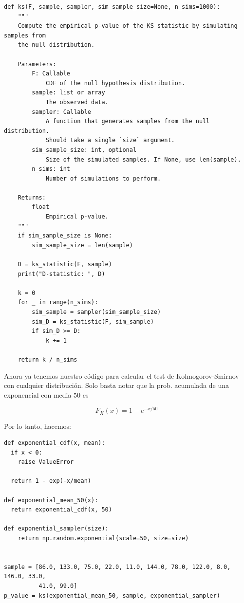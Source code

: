 \documentclass[a4paper, 12pt]{article}
\begin{document}
\footnotesize
\begin{verbatim}
def ks(F, sample, sampler, sim_sample_size=None, n_sims=1000):
    """
    Compute the empirical p-value of the KS statistic by simulating samples from
    the null distribution.

    Parameters:
        F: Callable
            CDF of the null hypothesis distribution.
        sample: list or array
            The observed data.
        sampler: Callable
            A function that generates samples from the null distribution. 
            Should take a single `size` argument.
        sim_sample_size: int, optional
            Size of the simulated samples. If None, use len(sample).
        n_sims: int
            Number of simulations to perform.

    Returns:
        float
            Empirical p-value.
    """
    if sim_sample_size is None:
        sim_sample_size = len(sample)

    D = ks_statistic(F, sample)
    print("D-statistic: ", D)

    k = 0
    for _ in range(n_sims):
        sim_sample = sampler(sim_sample_size)
        sim_D = ks_statistic(F, sim_sample)
        if sim_D >= D:
            k += 1

    return k / n_sims
\end{verbatim}

\normalsize
Ahora ya tenemos nuestro código para calcular el test de Kolmogorov-Smirnov con
cualquier distribución. Solo basta notar que la prob. acumulada de una
exponencial con media $50$ es 

\begin{equation*}
    F_X(x) = 1 - e^{-x / 50}
\end{equation*}

Por lo tanto, hacemos:
\footnotesize
\begin{verbatim}
def exponential_cdf(x, mean):
  if x < 0:
    raise ValueError 

  return 1 - exp(-x/mean)

def exponential_mean_50(x):
  return exponential_cdf(x, 50)

def exponential_sampler(size):
    return np.random.exponential(scale=50, size=size)


sample = [86.0, 133.0, 75.0, 22.0, 11.0, 144.0, 78.0, 122.0, 8.0, 146.0, 33.0,
          41.0, 99.0]
p_value = ks(exponential_mean_50, sample, exponential_sampler)
\end{verbatim}

\normalsize 
\end{document}
